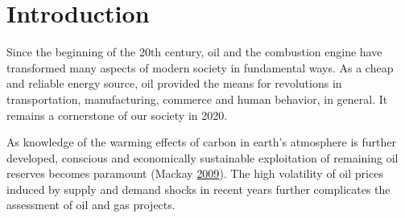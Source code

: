 \documentclass[english,msc,numbers]{coppe}
\begin{document}
  \mainmatter

  \hypertarget{introduction}{%
  \chapter{Introduction}\label{introduction}}
  
  Since the beginning of the 20th century, oil and the combustion engine have transformed many aspects of modern society in fundamental ways. As a cheap and reliable energy source, oil provided the means for revolutions in transportation, manufacturing, commerce and human behavior, in general. It remains a cornerstone of our society in 2020.
  
  As knowledge of the warming effects of carbon in earth's atmosphere is further developed, conscious and economically sustainable exploitation of remaining oil reserves becomes paramount (Mackay \protect\hyperlink{ref-Mackay2009}{2009}). The high volatility of oil prices induced by supply and demand shocks in recent years further complicates the assessment of oil and gas projects.
  
\end{document}
